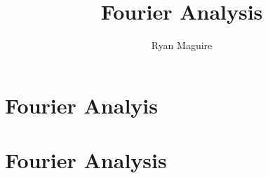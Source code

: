 \documentclass[crop=false,class=book,oneside]{standalone}
\begin{document}
    \ifx\ifmathcourses\undefined
        \title{Fourier Analysis}
        \author{Ryan Maguire}
        \date{\vspace{-5ex}}
        \maketitle
        \tableofcontents
        \clearpage
        \chapter*{Fourier Analyis}
        \setcounter{chapter}{1}
    \else
        \chapter{Fourier Analysis}
    \fi
\end{document}
